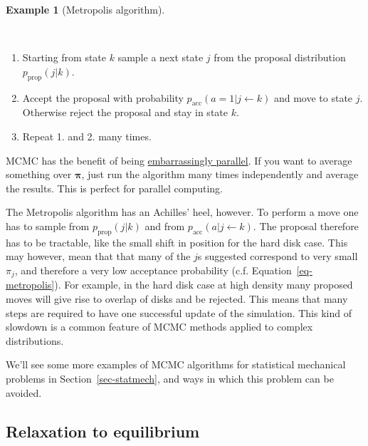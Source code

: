\documentclass[
  letterpaper,
  DIV=11,
  numbers=noendperiod]{scrreprt}
\providecommand{\tightlist}{%
  \setlength{\itemsep}{0pt}\setlength{\parskip}{0pt}}\usepackage{longtable,booktabs,array}
\theoremstyle{definition}
\newtheorem{example}{Example}[chapter]
\theoremstyle{remark}
\begin{document}
\leavevmode{}%
\begin{example}[Metropolis algorithm]\label{exm-metropolis-gen}

~

\begin{enumerate}
\def\labelenumi{\arabic{enumi}.}
\tightlist
\item
  Starting from state \(k\) sample a next state \(j\) from the proposal
  distribution \(p_\text{prop}(j|k)\).
\item
  Accept the proposal with probability
  \(p_\text{acc}(a=1|j \leftarrow k)\) and move to state \(j\).
  Otherwise reject the proposal and stay in state \(k\).
\item
  Repeat 1. and 2. many times.
\end{enumerate}

\end{example}

MCMC has the benefit of being
\href{https://en.wikipedia.org/wiki/Embarrassingly_parallel}{embarrassingly
parallel}. If you want to average something over \(\boldsymbol{\pi}\),
just run the algorithm many times independently and average the results.
This is perfect for parallel computing.

The Metropolis algorithm has an Achilles' heel, however. To perform a
move one has to sample from \(p_\text{prop}(j|k)\) and from
\(p_\text{acc}(a|j \leftarrow k)\). The proposal therefore has to be
tractable, like the small shift in position for the hard disk case. This
may however, mean that that many of the \(j\)s suggested correspond to
very small \(\pi_j\), and therefore a very low acceptance probability
(c.f. Equation~\ref{eq-metropolis}). For example, in the hard disk case
at high density many proposed moves will give rise to overlap of disks
and be rejected. This means that many steps are required to have one
successful update of the simulation. This kind of slowdown is a common
feature of MCMC methods applied to complex distributions.

We'll see some more examples of MCMC algorithms for statistical
mechanical problems in Section~\ref{sec-statmech}, and ways in which
this problem can be avoided.

\hypertarget{relaxation-to-equilibrium}{%
\subsection{Relaxation to equilibrium}\label{relaxation-to-equilibrium}}
\end{document}
